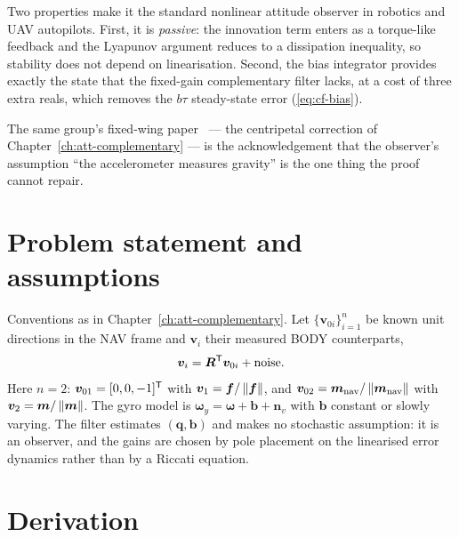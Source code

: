 Two properties make it the standard nonlinear attitude observer in robotics and UAV autopilots.
First, it is \emph{passive}: the innovation term enters as a torque-like feedback and the Lyapunov
argument reduces to a dissipation inequality, so stability does not depend on linearisation.
Second, the bias integrator provides exactly the state that the fixed-gain complementary filter
lacks, at a cost of three extra reals, which removes the $b\tau$ steady-state error
(\eqref{eq:cf-bias}).

The same group's fixed-wing paper~\cite{euston2008} --- the centripetal correction of
Chapter~\ref{ch:att-complementary} --- is the acknowledgement that the observer's assumption
``the accelerometer measures gravity'' is the one thing the proof cannot repair.

\section{Problem statement and assumptions}
Conventions as in Chapter~\ref{ch:att-complementary}. Let $\{\bm{v}_{0i}\}_{i=1}^{n}$ be known unit
directions in the NAV frame and $\bm{v}_i$ their measured BODY counterparts,
\begin{equation}
\bm{v}_i = \bm{R}^{\mathsf{T}}\bm{v}_{0i} + \text{noise} .
\label{eq:mh-obs}
\end{equation}
Here $n=2$: $\bm{v}_{01}=[0,0,-1]^{\mathsf{T}}$ with $\bm{v}_1=\bm{f}/\left\lVert \bm{f} \right\rVert$, and
$\bm{v}_{02}=\bm{m}_{\text{nav}}/\left\lVert \bm{m}_{\text{nav}} \right\rVert$ with $\bm{v}_2=\bm{m}/\left\lVert \bm{m} \right\rVert$.
The gyro model is $\bm{\omega}_y=\bm{\omega}+\bm{b}+\bm{n}_v$ with $\bm{b}$ constant or slowly
varying. The filter estimates $(\bm{q},\bm{b})$ and makes no stochastic assumption: it is an
observer, and the gains are chosen by pole placement on the linearised error dynamics rather than
by a Riccati equation.

\section{Derivation}

